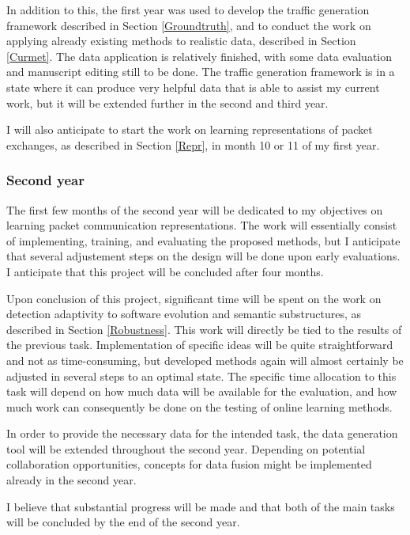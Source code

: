 \documentclass[a4paper,12pt,twoside]{report}
\begin{document}
In addition to this, the first year was used to develop the traffic generation framework described in Section \ref{Groundtruth}, and to conduct the work on applying already existing methods to realistic data, described in Section \ref{Curmet}. The data application is relatively finished, with some data evaluation and manuscript editing still to be done. The traffic generation framework is in a state where it can produce very helpful data that is able to assist my current work, but it will be extended further in the second and third year.

I will also anticipate to start the work on learning representations of packet exchanges, as described in Section \ref{Repr}, in month 10 or 11 of my first year.

\subsubsection{Second year}

The first few months of the second year will be dedicated to my objectives on learning packet communication representations. The work will essentially consist of
implementing, training, and evaluating the proposed methods, but I anticipate that several adjustement steps on the design will be done upon early evaluations. I anticipate that this project will be concluded after four months.

Upon conclusion of this project, significant time will be spent on the work on detection adaptivity to software evolution and semantic substructures, as described in Section \ref{Robustness}. This work will directly be tied to the results of the previous task. Implementation of specific ideas will be quite straightforward and not as time-consuming, but developed methods again will almost certainly be adjusted in several steps to an optimal state. The specific time allocation to this task will depend on how much data will be available for the evaluation, and how much work can consequently be done on the testing of online learning methods. 

In order to provide the necessary data for the intended task, the data generation tool will be extended throughout the second year. Depending on potential collaboration opportunities, concepts for data fusion might be implemented already in the second year.

I believe that substantial progress will be made and that both of the main tasks will be concluded by the end of the second year.
\end{document}
